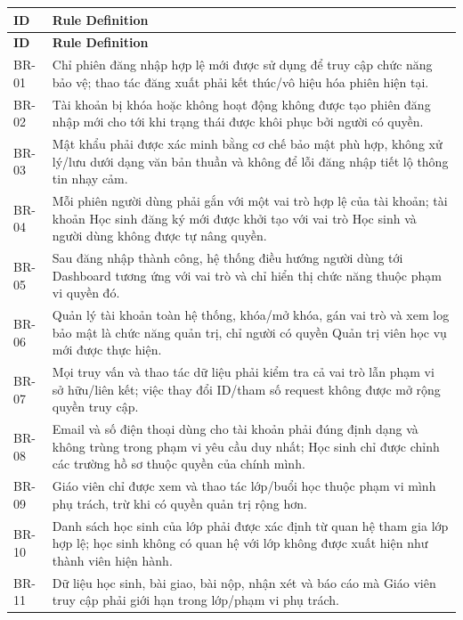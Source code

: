 \documentclass[12pt,a4paper,oneside]{report}
\begin{document}
\renewcommand{\arraystretch}{1.15}
\begin{longtable}{|p{1.6cm}|p{12.7cm}|}
\hline
\rowcolor{orange!15}
\textbf{ID} & \textbf{Rule Definition} \\
\hline
\endfirsthead
\hline
\rowcolor{orange!15}
\textbf{ID} & \textbf{Rule Definition} \\
\hline
\endhead
BR-01 & Chỉ phiên đăng nhập hợp lệ mới được sử dụng để truy cập chức năng bảo vệ; thao tác đăng xuất phải kết thúc/vô hiệu hóa phiên hiện tại. \\ \hline
BR-02 & Tài khoản bị khóa hoặc không hoạt động không được tạo phiên đăng nhập mới cho tới khi trạng thái được khôi phục bởi người có quyền. \\ \hline
BR-03 & Mật khẩu phải được xác minh bằng cơ chế bảo mật phù hợp, không xử lý/lưu dưới dạng văn bản thuần và không để lỗi đăng nhập tiết lộ thông tin nhạy cảm. \\ \hline
BR-04 & Mỗi phiên người dùng phải gắn với một vai trò hợp lệ của tài khoản; tài khoản Học sinh đăng ký mới được khởi tạo với vai trò Học sinh và người dùng không được tự nâng quyền. \\ \hline
BR-05 & Sau đăng nhập thành công, hệ thống điều hướng người dùng tới Dashboard tương ứng với vai trò và chỉ hiển thị chức năng thuộc phạm vi quyền đó. \\ \hline
BR-06 & Quản lý tài khoản toàn hệ thống, khóa/mở khóa, gán vai trò và xem log bảo mật là chức năng quản trị, chỉ người có quyền Quản trị viên học vụ mới được thực hiện. \\ \hline
BR-07 & Mọi truy vấn và thao tác dữ liệu phải kiểm tra cả vai trò lẫn phạm vi sở hữu/liên kết; việc thay đổi ID/tham số request không được mở rộng quyền truy cập. \\ \hline
BR-08 & Email và số điện thoại dùng cho tài khoản phải đúng định dạng và không trùng trong phạm vi yêu cầu duy nhất; Học sinh chỉ được chỉnh các trường hồ sơ thuộc quyền của chính mình. \\ \hline
BR-09 & Giáo viên chỉ được xem và thao tác lớp/buổi học thuộc phạm vi mình phụ trách, trừ khi có quyền quản trị rộng hơn. \\ \hline
BR-10 & Danh sách học sinh của lớp phải được xác định từ quan hệ tham gia lớp hợp lệ; học sinh không có quan hệ với lớp không được xuất hiện như thành viên hiện hành. \\ \hline
BR-11 & Dữ liệu học sinh, bài giao, bài nộp, nhận xét và báo cáo mà Giáo viên truy cập phải giới hạn trong lớp/phạm vi phụ trách. \\ \hline

\end{longtable}
\end{document}
